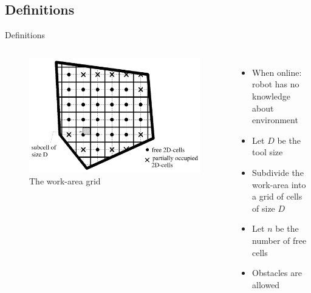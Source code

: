 \documentclass{beamer}
\begin{document}
\subsection{Definitions}
\begin{frame}{Definitions}
    \begin{columns}
        \begin{figure}
            \includegraphics[width=\linewidth]{Images/inv_fig1.png}
            \caption{The work-area grid}
        \end{figure}
        \begin{itemize}
            \item When online: robot has no knowledge about environment
            \item Let $D$ be the tool size
            \item Subdivide the work-area into a grid of cells of size $D$
            \item Let $n$ be the number of free cells
            \item Obstacles are allowed
        \end{itemize}
    \end{columns}
\end{frame}
\end{document}
